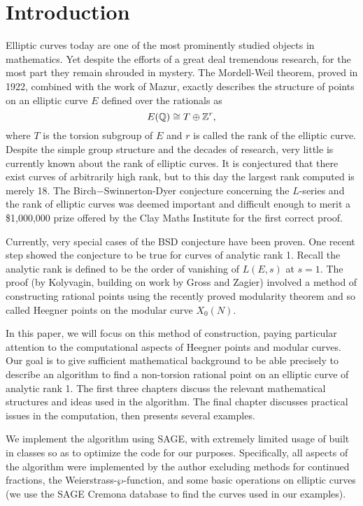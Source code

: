 \chapter{Introduction}
Elliptic curves today are one of the most prominently studied objects in mathematics. Yet despite the efforts of a great deal tremendous research, for the most part they remain shrouded in mystery. The Mordell-Weil theorem, proved in 1922, combined with the work of Mazur, exactly describes the structure of points on an elliptic curve $E$ defined over the rationals as
$$E(\mathbb{Q}) \cong T \oplus \mathbb{Z}^r,$$
where $T$ is the torsion subgroup of $E$ and $r$ is called the rank of the elliptic curve. Despite the simple group structure and the decades of research, very little is currently known about the rank of elliptic curves. It is conjectured that there exist curves of arbitrarily high rank, but to this day the largest rank computed is merely 18. The Birch$-$Swinnerton-Dyer conjecture concerning the $L$-series and the rank of elliptic curves was deemed important and difficult enough to merit a \$1,000,000 prize offered by the Clay Maths Institute for the first correct proof.

Currently, very special cases of the BSD conjecture have been proven. One recent step showed the conjecture to be true for curves of analytic rank 1. Recall the analytic rank is defined to be the order of vanishing of $L(E,s)$ at $s=1$. The proof (by Kolyvagin, building on work by Gross and Zagier) involved a method of constructing rational points using the recently proved modularity theorem and so called Heegner points on the modular curve $X_0(N)$. 

In this paper, we will focus on this method of construction, paying particular attention to the computational aspects of Heegner points and modular curves. Our goal is to give sufficient mathematical background to be able precisely to describe an algorithm to find a non-torsion rational point on an elliptic curve of analytic rank 1. The first three chapters discuss the relevant mathematical structures and ideas used in the algorithm. The final chapter discusses practical issues in the computation, then presents several examples.

We implement the algorithm using SAGE, with extremely limited usage of built in classes so as to optimize the code for our purposes. Specifically, all aspects of the algorithm were implemented by the author excluding methods for continued fractions, the Weierstrass-$\wp$-function, and some basic operations on elliptic curves (we use the SAGE Cremona database to find the curves used in our examples).